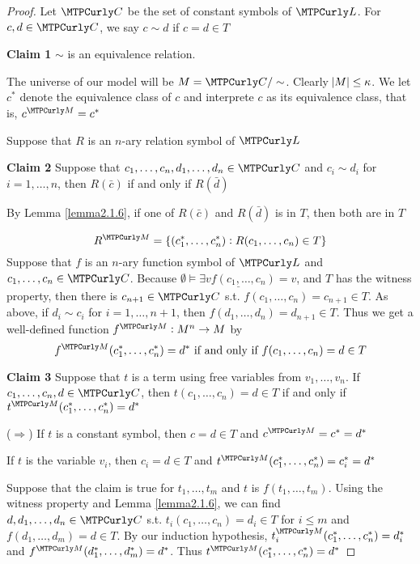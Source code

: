 \documentclass[11pt]{article}
\begin{document}
\begin{proof}
Let \(\calc\) be the set of constant symbols of \(\call\). For \(c,d\in\calc\),
we say \(c\sim d\) if \(c=d\in T\)

\textbf{Claim 1} \(\sim\) is an equivalence relation. 

The universe of our model will be \(M=\calc/\sim\). Clearly
\(\abs{M}\le\kappa\). We let \(c^*\) denote the equivalence class of \(c\) and
interprete \(c\) as its equivalence class, that is, \(c^\calm=c^*\)

Suppose that \(R\) is an \(n\)-ary relation symbol of \(\call\)

\textbf{Claim 2} Suppose that \(c_1,\dots,c_n,d_1,\dots,d_n\in\calc\) and \(c_i\sim d_i\)
for \(i=1,\dots,n\), then \(R(\bar{c})\) if and only if \(R(\bar{d})\)

By Lemma \ref{lemma2.1.6}, if one of \(R(\bar{c})\) and \(R(\bar{d})\) is
in \(T\), then both are in \(T\)


\begin{equation*}
R^\calm=\{(c_1^*,\dots,c_n^*):R(c_1,\dots,c_n)\in T\}
\end{equation*}
Suppose that \(f\) is an \(n\)-ary function symbol of \(\call\) and
\(c_1,\dots,c_n\in\calc\). Because  \(\underline{\emptyset\models\exists
    vf(c_1,\dots,c_n)=v}\), and \(T\) has the witness property, then there is
\(c_{n+1}\in\calc\) s.t. \(f(c_1,\dots,c_n)=c_{n+1}\in T\). As above, if
\(d_i\sim c_i\) for \(i=1,\dots,n+1\), then \(f(d_1,\dots,d_n)=d_{n+1}\in T\).
Thus we get a well-defined function \(f^\calm:M^n\to M\) by
\begin{equation*}
f^\calm(c_1^*,\dots,c_n^*)=d^*\text{ if and only if }f(c_1,\dots,c_n)=d\in T
\end{equation*}

\textbf{Claim 3} Suppose that \(t\) is a term using free variables from
\(v_1,\dots,v_n\). If \(c_1,\dots,c_n,d\in\calc\), then \(t(c_1,\dots,c_n)=d\in
    T\) if and only if \(t^\calm(c_1^*,\dots,c_n^*)=d^*\)

(\(\Rightarrow\)) If \(t\) is a constant symbol, then \(c=d\in T\) and
\(c^\calm=c^*=d^*\)

If \(t\) is the variable \(v_i\), then \(c_i=d\in T\) and 
\(t^\calm(c_1^*,\dots,c_n^*)=c_i^*=d^*\)

Suppose that the claim is true for \(t_1,\dots,t_m\) and \(t\) is
\(f(t_1,\dots,t_m)\). Using the witness property and Lemma \ref{lemma2.1.6},
we can find \(d,d_1,\dots,d_n\in\calc\) s.t. \(t_i(c_1,\dots,c_n)=d_i\in T\)
for \(i\le m\) and \(f(d_1,\dots,d_m)=d\in T\). By our induction hypothesis, 
\(t_i^\calm(c_1^*,\dots,c_n^*)=d_i^*\) and
\(f^\calm(d_1^*,\dots,d_m^*)=d^*\). Thus \(t^\calm(c_1^*,\dots,c_n^*)=d^*\)


\end{proof}
\end{document}
